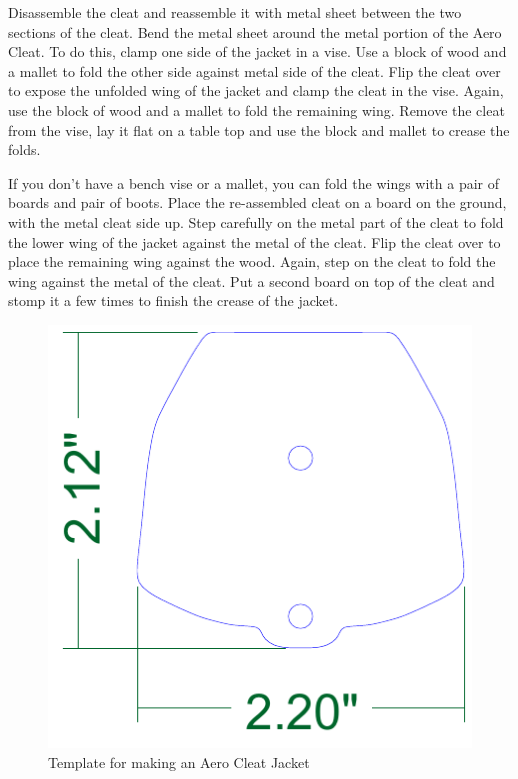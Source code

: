 \documentclass[
]{book}
\begin{document}
Disassemble the cleat and reassemble it with metal sheet between the two sections of the cleat. Bend the metal sheet around the metal portion of the Aero Cleat. To do this, clamp one side of the jacket in a vise. Use a block of wood and a mallet to fold the other side against metal side of the cleat. Flip the cleat over to expose the unfolded wing of the jacket and clamp the cleat in the vise. Again, use the block of wood and a mallet to fold the remaining wing. Remove the cleat from the vise, lay it flat on a table top and use the block and mallet to crease the folds.

If you don't have a bench vise or a mallet, you can fold the wings with a pair of boards and pair of boots. Place the re-assembled cleat on a board on the ground, with the metal cleat side up. Step carefully on the metal part of the cleat to fold the lower wing of the jacket against the metal of the cleat. Flip the cleat over to place the remaining wing against the wood. Again, step on the cleat to fold the wing against the metal of the cleat. Put a second board on top of the cleat and stomp it a few times to finish the crease of the jacket.

\begin{figure}

{\centering \includegraphics[width=1\linewidth]{images/cleat_jacket_template} 

}

\caption{Template for making an Aero Cleat Jacket}\label{fig:cleat-jacket-template}
\end{figure}
\end{document}
